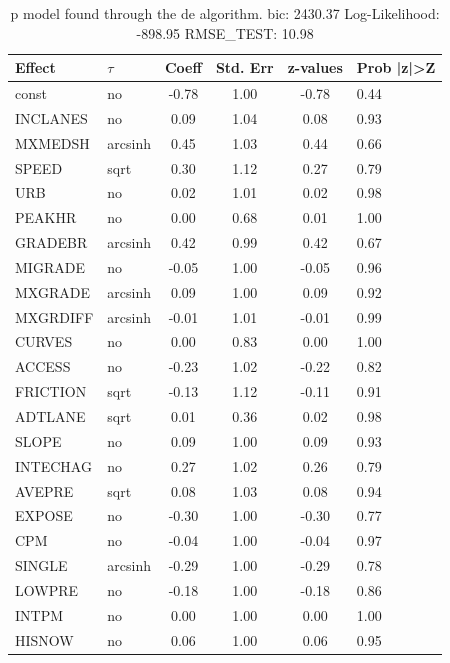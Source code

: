 \begin{table}
	\caption{p model found through the de algorithm. bic: 2430.37 Log-Likelihood: -898.95 RMSE_TEST: 10.98}
	\begin{center}
		\begin{tabular}{|l|l|c|c|c|l|}
			\hline
			Effect & $\tau$ & Coeff & Std. Err & z-values & Prob |z|>Z \\
			\hline
			const & no & -0.78 & 1.00 & -0.78 & 0.44 \\
			\hline
			INCLANES & no & 0.09 & 1.04 & 0.08 & 0.93 \\
			\hline
			MXMEDSH & arcsinh & 0.45 & 1.03 & 0.44 & 0.66 \\
			\hline
			SPEED & sqrt & 0.30 & 1.12 & 0.27 & 0.79 \\
			\hline
			URB & no & 0.02 & 1.01 & 0.02 & 0.98 \\
			\hline
			PEAKHR & no & 0.00 & 0.68 & 0.01 & 1.00 \\
			\hline
			GRADEBR & arcsinh & 0.42 & 0.99 & 0.42 & 0.67 \\
			\hline
			MIGRADE & no & -0.05 & 1.00 & -0.05 & 0.96 \\
			\hline
			MXGRADE & arcsinh & 0.09 & 1.00 & 0.09 & 0.92 \\
			\hline
			MXGRDIFF & arcsinh & -0.01 & 1.01 & -0.01 & 0.99 \\
			\hline
			CURVES & no & 0.00 & 0.83 & 0.00 & 1.00 \\
			\hline
			ACCESS & no & -0.23 & 1.02 & -0.22 & 0.82 \\
			\hline
			FRICTION & sqrt & -0.13 & 1.12 & -0.11 & 0.91 \\
			\hline
			ADTLANE & sqrt & 0.01 & 0.36 & 0.02 & 0.98 \\
			\hline
			SLOPE & no & 0.09 & 1.00 & 0.09 & 0.93 \\
			\hline
			INTECHAG & no & 0.27 & 1.02 & 0.26 & 0.79 \\
			\hline
			AVEPRE & sqrt & 0.08 & 1.03 & 0.08 & 0.94 \\
			\hline
			EXPOSE & no & -0.30 & 1.00 & -0.30 & 0.77 \\
			\hline
			CPM & no & -0.04 & 1.00 & -0.04 & 0.97 \\
			\hline
			SINGLE & arcsinh & -0.29 & 1.00 & -0.29 & 0.78 \\
			\hline
			LOWPRE & no & -0.18 & 1.00 & -0.18 & 0.86 \\
			\hline
			INTPM & no & 0.00 & 1.00 & 0.00 & 1.00 \\
			\hline
			HISNOW & no & 0.06 & 1.00 & 0.06 & 0.95 \\

\end{tabular}
\end{center}
\end{table}
